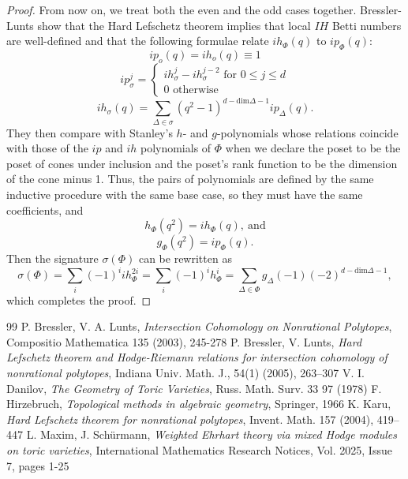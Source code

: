 \documentclass[10pt,a4paper]{amsart}
\begin{document}
\begin{proof}
From now on, we treat both the even and the odd cases together. Bressler-Lunts show that the Hard Lefschetz theorem implies that local $IH$ Betti numbers are well-defined \cite[Corollary 7.4]{BL} and that the following formulae \cite[Proposition 7.7]{BL} relate $ih_\Phi(q)$ to $ip_\Phi(q)$:
\[ip_o(q)=ih_o(q)\equiv1\]
\[ip^j_\sigma=\begin{cases}
                ih_\sigma^j-ih_\sigma^{j-2} \text{ for } 0\leq j\leq d  \\
                0 \text{ otherwise}
                 \end{cases}
\]
\[ih_\sigma(q)=\sum_{\Delta\in\sigma}(q^2-1)^{d-\text{dim}\Delta-1}ip_\Delta(q).\]
They then compare with Stanley's $h$- and $g$-polynomials whose relations coincide with those of the $ip$ and $ih$ polynomials of $\Phi$ when we declare the poset to be the poset of cones under inclusion and the poset's rank function to be the dimension of the cone minus 1. Thus, the pairs of polynomials are defined by the same inductive procedure with the same base case, so they must have the same coefficients, and $$h_\Phi(q^2)=ih_\Phi(q),\ \text{{and}}$$
$$g_\Phi(q^2)=ip_\Phi(q).$$
Then the signature $\sigma(\Phi)$ can be rewritten as
$$\sigma(\Phi)=\sum_i(-1)^iih_\Phi^{2i}=\sum_i(-1)^ih_\Phi^{i}=\sum_{\Delta\in\Phi} g_\Delta(-1)(-2)^{d-\text{dim}\Delta-1},$$
which completes the proof.
\end{proof}


\begin{thebibliography}{99}
 P. Bressler, V. A. Lunts, {\it Intersection Cohomology on Nonrational Polytopes}, Compositio Mathematica 135 (2003), 245-278
 P. Bressler, V. Lunts, {\it Hard Lefschetz theorem and Hodge-Riemann relations for intersection cohomology of nonrational polytopes}, Indiana Univ. Math. J., 54(1) (2005), 263–307
 V. I. Danilov, {\it The Geometry of Toric Varieties}, Russ. Math. Surv. 33 97 (1978)
 F. Hirzebruch, {\it Topological methods in algebraic geometry}, Springer, 1966
 K. Karu, {\it Hard Lefschetz theorem for nonrational polytopes}, Invent. Math. 157 (2004), 419–447
 L. Maxim, J. Sch\"urmann, {\it Weighted Ehrhart theory via mixed Hodge modules on toric varieties}, International Mathematics Research Notices, Vol. 2025, Issue 7, pages 1-25
\end{thebibliography}
\end{document}
